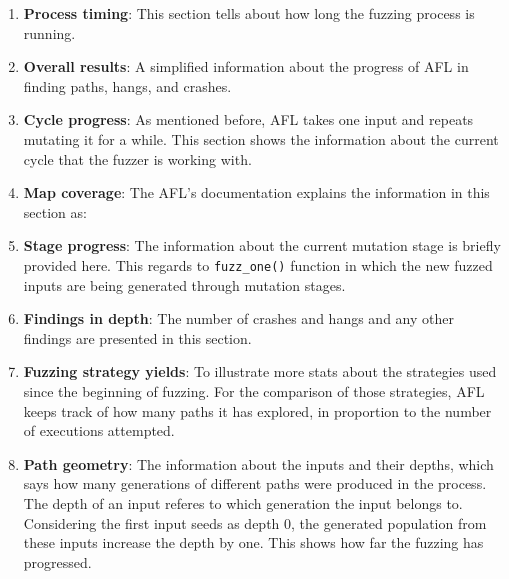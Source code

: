 \begin{enumerate}
    \item \textbf{Process timing}: This section tells about how long the fuzzing process is running.
    
    \item \textbf{Overall results}: A simplified information about the progress of AFL in finding paths, hangs, and crashes. 

    \item \textbf{Cycle progress}: As mentioned before, AFL takes one input and repeats mutating it for a while. This section shows the information about the current cycle that the fuzzer is working with.

    \item \textbf{Map coverage}: The AFL's documentation explains the information in this section as: 

    \item \textbf{Stage progress}: The information about the current mutation stage is briefly provided here. This regards to \texttt{fuzz\_one()} function in which the new fuzzed inputs are being generated through mutation stages.

    \item \textbf{Findings in depth}: The number of crashes and hangs and any other findings are presented in this section.

    \item \textbf{Fuzzing strategy yields}: To illustrate more stats about the strategies used since the beginning of fuzzing. For the comparison of those strategies, AFL keeps track of how many paths it has explored, in proportion to the number of executions attempted.

    \item \textbf{Path geometry}: The information about the inputs and their depths, which says how many generations of different paths were produced in the process. The depth of an input referes to which generation the input belongs to. Considering the first input seeds as depth 0, the generated population from these inputs increase the depth by one. This shows how far the fuzzing has progressed.
\end{enumerate}

